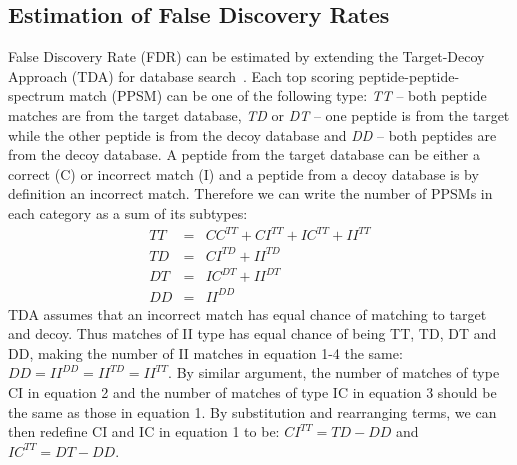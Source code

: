 \documentclass[runningheads,a4paper]{llncs}
\begin{document}

\subsection*{Estimation of False Discovery Rates}
False Discovery Rate (FDR) can be estimated by extending the Target-Decoy Approach (TDA) for database search~\cite{elias07}. Each top scoring peptide-peptide-spectrum match (PPSM) can be one of the following type: \emph{TT} -- both peptide matches are from the target database, \emph{TD} or \emph{DT}  -- one peptide is from the target while the other peptide is from the decoy database and \emph{DD} -- both peptides are from the decoy database. A peptide from the target database can be either a correct (C) or incorrect match (I) and a peptide from a decoy database is by definition an incorrect match. Therefore we can write the number of PPSMs in each category as a sum of its subtypes:
\begin{eqnarray}
TT &=& CC^{TT} + CI^{TT} + IC^{TT} + II^{TT} \\
TD &=& CI^{TD} + II^{TD}  \\
DT &=& IC^{DT} + II^{DT}  \\
DD &=& II^{DD}       
\end{eqnarray}
TDA assumes that an incorrect match has equal chance of matching to target and decoy. Thus matches of II type has equal chance of being TT, TD, DT and DD, making the number of II matches in equation 1-4 the same: $DD = II^{DD}=II^{TD}=II^{TT}$.  By similar argument, the number of matches of type CI in equation 2 and the number of matches of type IC in equation 3 should be the same as those in equation 1. By substitution and rearranging terms, we can then redefine CI and IC in equation 1 to be: $CI^{TT} = TD - DD$ and $IC^{TT} = DT - DD$.  
\end{document}
